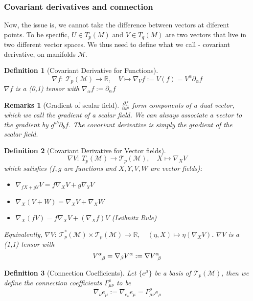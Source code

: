 \documentclass[a4paper]{article}
\newtheorem{remarks}{Remarks}[section]
\theoremstyle{new}
\newtheorem{defi}{Definition}[section]
\begin{document}
\subsubsection{Covariant derivatives and connection}
Now, the issue is, we cannot take the difference between vectors at diferent points. To be specific, $U\in T_p(M)$ and $V\in T_q(M)$ are two vectors that live in two different vector spaces. We thus need to define what we call - covariant derivative, on manifolds $\mathcal{M}$.
\begin{defi}[Covariant Derivative for Functions]
$$\nabla  f:~\mathcal{T}_p(\mathcal{M})\rightarrow\mathbb{R},\quad V\mapsto\nabla_Vf:=V(f)=V^\alpha\partial_\alpha f$$
$\nabla f$ is a (0,1) tensor with $\nabla_\alpha f:=\partial_\alpha f$
\end{defi}
\begin{remarks}[Gradient of scalar field]
$\frac{\partial f}{\partial x^a}$ form components of a dual vector, which we call the gradient of a scalar field. We can always associate a vector to the gradient by $g^{ab}\partial_bf$. The covariant derivative is simply the gradient of the scalar field.
\end{remarks}
\begin{defi}[Covariant Derivative for Vector fields]
$$\nabla  V:~T_p(\mathcal{M})\rightarrow\mathcal{T}_p(\mathcal{M}),\quad X\mapsto\nabla_XV$$
which satisfies ($f,g$ are functions and $X,Y,V,W$ are vector fields):
\begin{itemize}
    \item $\nabla_{fX+gY}V=f\nabla_XV+g\nabla_YV$
    \item $\nabla_X(V+W)=\nabla_XV+\nabla_XW$
    \item $\nabla_X(fV)=f\nabla_XV+(\nabla_Xf)V$ (Leibnitz Rule)
\end{itemize}
Equivalently, $\nabla V:~\mathcal{T}_p^*(\mathcal{M})\times \mathcal{T}_p(\mathcal{M})\rightarrow\mathbb{R},\quad (\eta,X)\mapsto\eta(\nabla_XV)$. $\nabla V$ is a (1,1) tensor with $$\tensor*{V}{*_{}^{\alpha}_{;\beta}}=\nabla_\beta V^\alpha:=\tensor*{\nabla V}{*_{}^{\alpha}_{\beta}}$$ 
\end{defi}
\begin{defi}[Connection Coefficients]
Let $\{e^\mu\}$ be a basis of $\mathcal{T}_p(\mathcal{M})$, then we define the connection coefficients $\Gamma^\rho_{\mu\nu}$ to be
$$\nabla_\nu e_\mu:=\nabla_{e_\nu}e_\mu=\Gamma_{\mu\nu}^\rho e_\rho$$
\end{defi}
\end{document}
